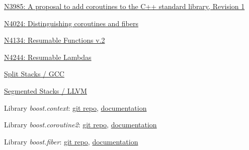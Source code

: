 \newpage
{}
\begin{thebibliography}{99}

        \href{http://www.open-std.org/jtc1/sc22/wg21/docs/papers/2014/n3985.pdf}
        {N3985: A proposal to add coroutines to the C++ standard library, Revision 1}

        \href{http://www.open-std.org/jtc1/sc22/wg21/docs/papers/2014/n4024.pdf}
        {N4024: Distinguishing coroutines and fibers}

        \href{http://www.open-std.org/jtc1/sc22/wg21/docs/papers/2014/n4134.pdf}
        {N4134: Resumable Functions v.2}

        \href{http://www.open-std.org/jtc1/sc22/wg21/docs/papers/2014/n4244.pdf}
        {N4244: Resumable Lambdas}

        \href{http://gcc.gnu.org/wiki/SplitStacks}
        {Split Stacks / GCC}

        \href{http://llvm.org/releases/3.0/docs/SegmentedStacks.html}
        {Segmented Stacks / LLVM}

        Library \textit{boost.context}:
        \href{https://github.com/boostorg/context} {git repo},
        \href{http://www.boost.org/doc/libs/1_58_0/libs/context/doc/html/index.html} {documentation}

        Library \textit{boost.coroutine2}:
        \href{https://github.com/boostorg/coroutine2} {git repo},
        \href{http://olk.github.io/libs/coroutine2/doc/html/index.html} {documentation}

        Library \textit{boost.fiber}:
        \href{https://github.com/olk/boost-fiber} {git repo},
        \href{http://olk.github.io/libs/fiber/doc/html/index.html} {documentation}

\end{thebibliography}
